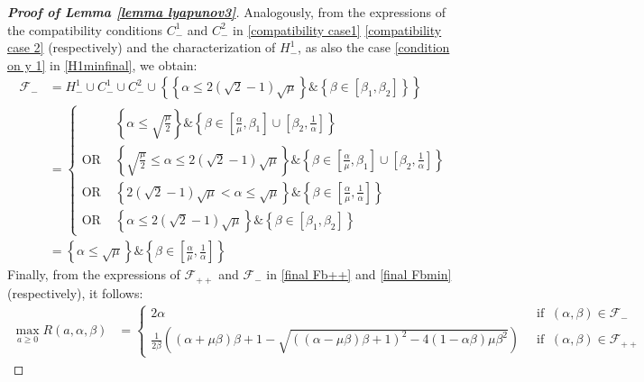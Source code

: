 \documentclass[reqno]{amsart}
\theoremstyle{plain}
\theoremstyle{definition}
\theoremstyle{remark}
\newcommand{\Fb}{\mathcal{F}}
\begin{document}
\begin{proof}[\textbf{Proof of Lemma \ref{lemma lyapunov3}}]
Analogously, from the expressions of the compatibility conditions $C_{-}^{1}$ and $C_{-}^{2}$ in \eqref{compatibility case1} \eqref{compatibility case 2} (respectively) and the characterization of $H_{-}^{1}$, as also the case \eqref{condition on y 1} in \eqref{H1minfinal},  we obtain:
\begin{equation}\label{final Fbmin}
	\begin{aligned}
		\Fb_{-} &= H_{-}^{1}\cup C_{-}^{1}\cup C_{-}^{2} \cup \left\{\left\{\alpha\leq 2(\sqrt{2}-1)\sqrt\mu\right\}\&\left\{\beta\in[\beta_{1},\beta_{2}]\right\}\right\} \\
		&=\begin{cases}
			& \left\{\alpha \leq \sqrt{\frac{\mu}{2}} \right\}\& \left\{\beta\in \left[\frac{\alpha}{\mu},\beta_{1}\right]\cup\left[\beta_{2},\frac{1}{\alpha}\right]\right\} \\
			\text{OR }	&\left\{\sqrt{\frac{\mu}{2}} \leq \alpha \leq 2(\sqrt{2}-1)\sqrt{\mu}\right\} \& \left\{\beta\in \left[  \frac{\alpha}{\mu},\beta_{1}\right]\cup\left[\beta_{2},\frac{1}{\alpha}\right]\right\} \\
			\text{OR } & \left\{2(\sqrt{2}-1)\sqrt{\mu}< \alpha\leq \sqrt{\mu}\right\} \& \left\{\beta\in \left[ \frac{\alpha}{\mu}, \frac{1}{\alpha} \right]\right\} \\
			\text{OR }	& \left\{\alpha\leq 2(\sqrt{2}-1)\sqrt\mu\right\}\&\left\{\beta\in[\beta_{1},\beta_{2}]\right\}
		\end{cases}		
		\\
		&= \left\{ \alpha\leq \sqrt{\mu}\right\} \& \left\{\beta\in \left[ \frac{\alpha}{\mu}, \frac{1}{\alpha} \right]\right\}
	\end{aligned}
\end{equation}	Finally, from the expressions of $\Fb_{++}$ and $\Fb_{-}$ in  \eqref{final Fb++} and \eqref{final Fbmin} (respectively),  it follows:
\begin{equation}
	\begin{aligned}
		\underset{a\geq0}{\max}R(a,\alpha,\beta) &=\begin{cases}
			2\alpha &~ \text{ if } ~  (\alpha,\beta) \in \Fb_{-}\\
			\frac{1}{2\beta}\left((\alpha+\mu\beta)\beta+1 - \sqrt{\left((\alpha-\mu\beta)\beta+1\right)^{2}-4(1-\alpha\beta)\mu\beta^{2}}\right) &~ \text{ if } ~  (\alpha,\beta) \in \Fb_{++}
		\end{cases}
	\end{aligned}
\end{equation}
\begin{equation}

\end{equation}
\end{proof}
\end{document}
